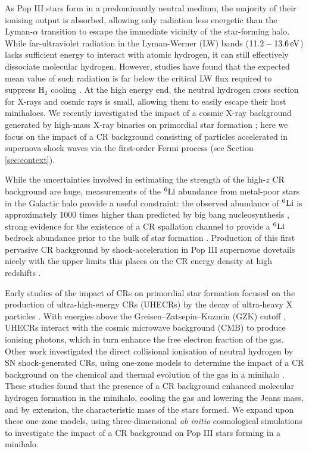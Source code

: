\documentclass[usenatbib]{mn2e}
\newcommand{\ev}{\,{\rm eV}}
\newcommand{\htwo}{\mathrm{H}_2}
\begin{document}
As Pop III stars form in a predominantly neutral medium, the majority of their ionising output is absorbed, allowing only radiation less energetic than the Lyman-$\alpha$ transition to escape the immediate vicinity of the star-forming halo.  
While far-ultraviolet radiation in the Lyman-Werner (LW) bands ($11.2 - 13.6\ev$) lacks sufficient energy to interact with atomic hydrogen, it can still effectively dissociate molecular hydrogen.  
However, studies have found that the expected mean value of such radiation is far below the critical LW flux required to suppress $\htwo$ cooling \mbox{\citep{Dijkstraetal2008}}. 
At the high energy end, the neutral hydrogen cross section for X-rays and cosmic rays is small, allowing them to easily escape their host minihaloes. 
We recently investigated the impact of a cosmic X-ray background generated by high-mass X-ray binaries on primordial star formation \citep{Hummeletal2015}; here we focus on the impact of a CR background consisting of particles accelerated in supernova shock waves via the first-order Fermi process (see Section \ref{sec:context}).  

While the uncertainties involved in estimating the strength of the high-$z$  CR background are huge,  measurements of the $^6{\rm Li}$ abundance from metal-poor stars in the Galactic halo provide a useful constraint: the observed abundance of  $^6{\rm Li}$ is approximately 1000 times higher than predicted by big bang nucleosynthesis \citep{Asplundetal2006}, strong evidence for the existence of a CR spallation channel to provide a $^6{\rm Li}$ bedrock abundance prior to the bulk of star formation \citep{RollindeVangioniOlive2005,RollindeVangioniOlive2006}. 
Production of this first pervasive CR background by shock-acceleration in Pop III supernovae dovetails nicely with the upper limits this places on the CR energy density at high redshifts \citep{RollindeVangioniOlive2006}.

Early studies of the impact of CRs on primordial star formation focused on the production of ultra-high-energy CRs (UHECRs) by the decay of ultra-heavy X particles \citep{ShchekinovVasiliev2004,VasilievShchekinov2006,RipamontiMapelliFerrara2007}.  
With energies above the Greisen--Zatsepin--Kuzmin (GZK) cutoff \citep{Greisen1966,ZatsepinKuzmin1966}, UHECRs interact with the cosmic microwave background (CMB) to produce ionising photons, which in turn enhance the free electron fraction of the gas.  
Other work investigated the direct collisional ionisation of neutral hydrogen by SN shock-generated CRs, using one-zone models to determine the impact of a CR background on the chemical and thermal evolution of the gas in a minihalo \citep{StacyBromm2007,JascheCiardiEnsslin2007}.  
These studies found that the presence of a CR background enhanced molecular hydrogen formation in the minihalo, cooling the gas and lowering the Jeans mass, and by extension, the characteristic mass of the stars formed. 
We expand upon these one-zone models, using three-dimensional \textit{ab initio} cosmological simulations to investigate the impact of a CR background on Pop III stars forming in a minihalo.
\end{document}
